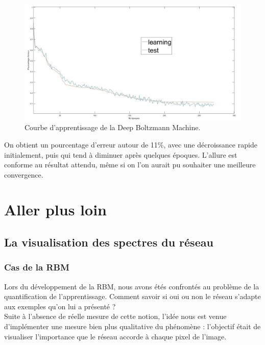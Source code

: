 \documentclass[a4paper,oneside]{report}
\begin{document}
                \begin{figure}
                    \begin{center}
                        \includegraphics[width=450px]{Images/courbeDBM.jpg}
                    \end{center}
                    \caption{Courbe d'apprentissage de la Deep Boltzmann Machine.}
                \end{figure}

On obtient un pourcentage d'erreur autour de 11\%, avec une décroissance rapide initialement, puis qui tend à diminuer après quelques époques. L'allure est conforme au résultat attendu, même si on l'on aurait pu souhaiter une meilleure convergence.


        \chapter{Aller plus loin}

            \section{La visualisation des spectres du réseau}

\subsection{Cas de la RBM}

                Lors du développement de la RBM, nous avons étés confrontés au problème de la quantification de l'apprentissage. Comment savoir si oui ou non le réseau s'adapte aux exemples qu'on lui a présenté ?\\

                Suite à l'absence de réelle mesure de cette notion, l'idée nous est venue d'implémenter une mesure bien plus qualitative du phénomène : l'objectif était de visualiser l'importance que le réseau accorde à chaque pixel de l'image.\\
\end{document}
